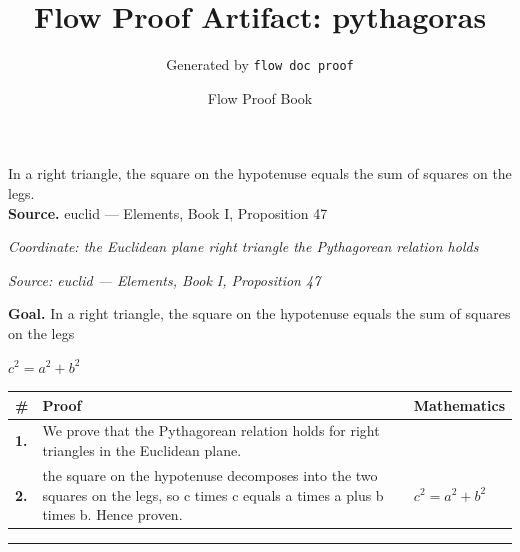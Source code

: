 \documentclass[11pt]{article}
\title{Flow Proof Artifact: pythagoras}
\author{Generated by \texttt{flow doc proof}}
\date{Flow Proof Book}
\theoremstyle{definition}
\begin{document}
\maketitle
In a right triangle, the square on the hypotenuse equals the sum of squares on the legs.\\[0.5em]
\textbf{Source.} euclid — Elements, Book I, Proposition 47\\[0.5em]
\bigskip
{}\par
\smallskip\noindent\textit{Coordinate: the Euclidean plane \cdot right triangle \cdot the Pythagorean relation holds}\par
\smallskip\noindent\textit{Source: euclid — Elements, Book I, Proposition 47}\par
\medskip
\noindent\textbf{Goal.} In a right triangle, the square on the hypotenuse equals the sum of squares on the legs\par
\noindent$\displaystyle c^{2} = a^{2} + b^{2}$\par
\medskip
\noindent
\begin{tabular}{@{} >{\raggedright\arraybackslash}p{} >{\raggedright\arraybackslash}p{} >{\raggedleft\arraybackslash}p{} @{}}
\textbf{\#} & \textbf{Proof} & \textbf{Mathematics} \\
\midrule
\textbf{1.} & We prove that the Pythagorean relation holds for right triangles in the Euclidean plane. & \\[0.45em]
\textbf{2.} & the square on the hypotenuse decomposes into the two squares on the legs, so c times c equals a times a plus b times b. Hence proven. & $\displaystyle c^{2} = a^{2} + b^{2}$ \\[0.45em]
\bottomrule
\end{tabular}
\label{thm:Geometry-right triangle-the_pythagorean_relation_holds}
\par\medskip\hrule
\end{document}
